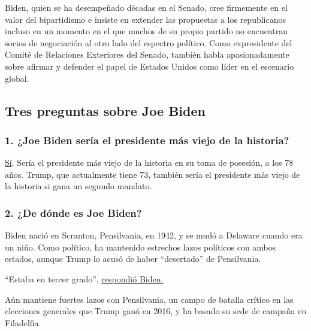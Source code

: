 Biden, quien se ha desempeñado décadas en el Senado, cree firmemente en
el valor del bipartidismo e insiste en extender las propuestas a los
republicanos incluso en un momento en el que muchos de su propio partido
no encuentran socios de negociación al otro lado del espectro político.
Como expresidente del Comité de Relaciones Exteriores del Senado,
también habla apasionadamente sobre afirmar y defender el papel de
Estados Unidos como líder en el escenario global.

\hypertarget{tres-preguntas-sobre-joe-biden}{%
\subsection{Tres preguntas sobre Joe
Biden}\label{tres-preguntas-sobre-joe-biden}}

\hypertarget{1-joe-biden-seruxeda-el-presidente-muxe1s-viejo-de-la-historia}{%
\subsubsection{\texorpdfstring{\textbf{1. ¿Joe Biden sería el presidente
más viejo de la
historia?}}{1. ¿Joe Biden sería el presidente más viejo de la historia?}}\label{1-joe-biden-seruxeda-el-presidente-muxe1s-viejo-de-la-historia}}

\href{https://www.nytimes.com/2019/07/29/us/politics/joe-biden-age.html}{Sí}.
Sería el presidente más viejo de la historia en su toma de posesión, a
los 78 años. Trump, que actualmente tiene 73, también sería el
presidente más viejo de la historia si gana un segundo mandato.

\hypertarget{2-de-duxf3nde-es-joe-biden}{%
\subsubsection{\texorpdfstring{\textbf{2. ¿De dónde es Joe
Biden?}}{2. ¿De dónde es Joe Biden?}}\label{2-de-duxf3nde-es-joe-biden}}

Biden nació en Scranton, Pensilvania, en 1942, y se mudó a Delaware
cuando era un niño. Como político, ha mantenido estrechos lazos
políticos con ambos estados, aunque Trump lo acusó de haber
``desertado'' de Pensilvania.

``Estaba en tercer grado'',
\href{https://www.nytimes.com/2019/05/28/us/politics/trump-biden-north-korea.html}{respondió
Biden}\href{https://www.nytimes.com/2019/05/28/us/politics/trump-biden-north-korea.html}{.}

Aún mantiene fuertes lazos con Pensilvania, un campo de batalla crítico
en las elecciones generales que Trump ganó en 2016, y ha basado su sede
de campaña en Filadelfia.


